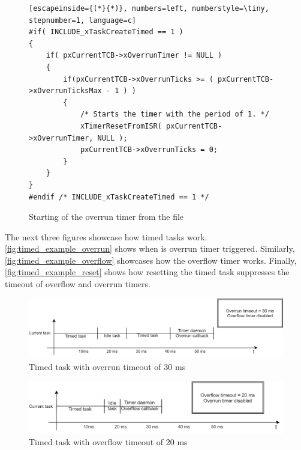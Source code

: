 \begin{figure}[H]
\begin{changemargin}{1cm}{1cm}
\begin{lstlisting}[escapeinside={(*}{*)}, numbers=left, numberstyle=\tiny, stepnumber=1, language=c]
#if( INCLUDE_xTaskCreateTimed == 1 )
{
    if( pxCurrentTCB->xOverrunTimer != NULL )
    {
        if(pxCurrentTCB->xOverrunTicks >= ( pxCurrentTCB->xOverrunTicksMax - 1 ) )
        {
            /* Starts the timer with the period of 1. */
            xTimerResetFromISR( pxCurrentTCB->xOverrunTimer, NULL );
            pxCurrentTCB->xOverrunTicks = 0;
        }
    }
}
#endif /* INCLUDE_xTaskCreateTimed == 1 */
\end{lstlisting}  
\end{changemargin}
\caption{Starting of the overrun timer from the file }
\label{fig:freertos_overrun_start}
    
\end{figure}


 The next three figures showcase how timed tasks work. \autoref{fig:timed_example_overrun} shows when is overrun timer triggered. Similarly, \autoref{fig:timed_example_overflow} showcases how the overflow timer works. Finally, \autoref{fig:timed_example_reset} shows how resetting the timed task suppresses the timeout of overflow and overrun timers.

\begin{figure}[H]

      \centering
      \includegraphics[width=\linewidth]{images/timed_example_overrun.png}
      \caption{Timed task with overrun timeout of 30 ms}
      \label{fig:timed_example_overrun}
    
\end{figure}

\begin{figure}[H]

      \centering
      \includegraphics[width=\linewidth]{images/timed_example_overflow.png}
      \caption{Timed task with overflow timeout of 20 ms}
      \label{fig:timed_example_overflow}
    
\end{figure}

